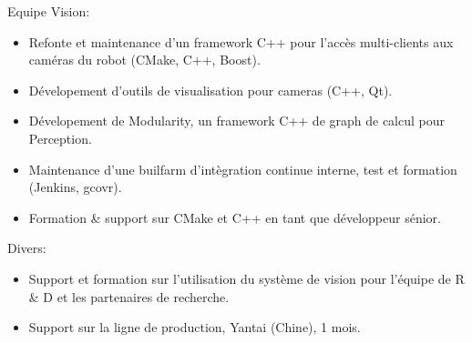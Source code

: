 \documentclass{article}
\begin{document}
\begin{llist}
{\begin{itemize}
\end{itemize}
Equipe Vision:
\vspace{-0.50cm}
\begin{itemize}
	\item Refonte et maintenance d'un framework C++ pour l'acc\`{e}s multi-clients aux cam\'{e}ras du robot (CMake, C++, Boost).
	\item D\'{e}velopement d'outils de visualisation pour cameras (C++, Qt).
	\item D\'{e}velopement de Modularity, un framework C++ de graph de calcul pour Perception.
	\item Maintenance d'une builfarm d'int\`{e}gration continue interne, test et formation (Jenkins, gcovr).
	\item Formation \& support sur CMake et C++ en tant que d\'{e}veloppeur s\'{e}nior.
\end{itemize}
Divers:
\vspace{-0.50cm}
\begin{itemize}
	\item Support et formation sur l'utilisation du syst\`{e}me de vision pour l'\'{e}quipe de R \& D et les partenaires de recherche.
	\item Support sur la ligne de production, Yantai (Chine), 1 mois.
\end{itemize}
}


\end{llist}
\end{document}

